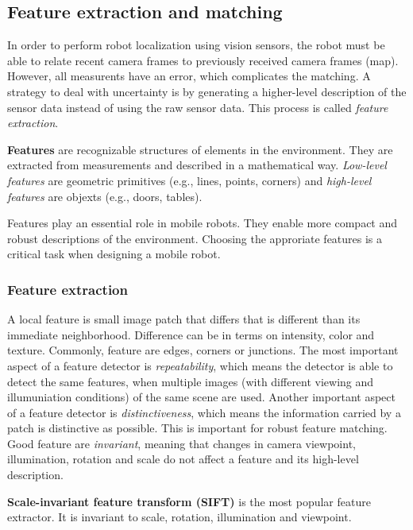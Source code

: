 \subsection{Feature extraction and matching}
In order to perform robot localization using vision sensors, the robot must be able to relate recent camera frames to previously received camera frames (map).
However, all measurents have an error, which complicates the matching.
A strategy to deal with uncertainty is by generating a higher-level description of the sensor data instead of using the raw sensor data.
This process is called \textit{feature extraction}.

\begin{mydef}
\textbf{Features} are recognizable structures of elements in the environment.
They are extracted from measurements and described in a mathematical way.
\textit{Low-level features} are geometric primitives (e.g., lines, points, corners) and \textit{high-level features} are objexts (e.g., doors, tables).
\end{mydef}

Features play an essential role in mobile robots.
They enable more compact and robust descriptions of the environment.
Choosing the approriate features is a critical task when designing a mobile robot.

\subsubsection{Feature extraction}
\label{sec:background-feature-extraction}
A local feature is small image patch that differs that is different than its immediate neighborhood.
Difference can be in terms on intensity, color and texture.
Commonly, feature are edges, corners or junctions.
The most important aspect of a feature detector is \textit{repeatability}, which means the detector is able to detect the same features, when multiple images (with different viewing and illumuniation conditions) of the same scene are used.
Another important aspect of a feature detector is \textit{distinctiveness}, which means the information carried by a patch is distinctive as possible.
This is important for robust feature matching.
Good feature are \textit{invariant}, meaning that changes in camera viewpoint, illumination, rotation and scale do not affect a feature and its high-level description.

\textbf{Scale-invariant feature transform (SIFT)} \cite{lowe1999object} is the most popular feature extractor.
It is invariant to scale, rotation, illumination and viewpoint.

